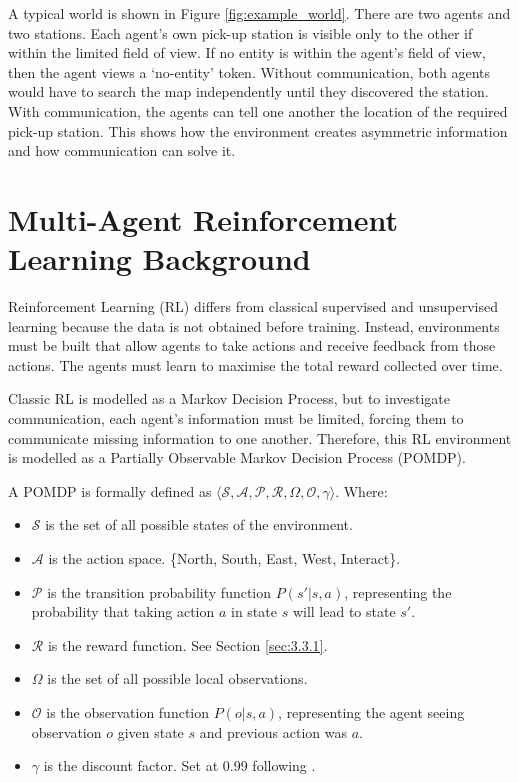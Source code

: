 A typical world is shown in Figure \ref{fig:example_world}. 
There are two agents and two stations.
Each agent's own pick-up station is visible only to the other if within the limited field of view.
If no entity is within the agent's field of view, then the agent views a `no-entity' token.
Without communication, both agents would have to search the map independently until they discovered the station.
With communication, the agents can tell one another the location of the required pick-up station.
This shows how the environment creates asymmetric information and how communication can solve it.

\section{Multi-Agent Reinforcement Learning Background}
\label{sec:2.2}

Reinforcement Learning (RL) differs from classical supervised and unsupervised learning because the data is not obtained before training.
Instead, environments must be built that allow agents to take actions and receive feedback from those actions.
The agents must learn to maximise the total reward collected over time.

Classic RL is modelled as a Markov Decision Process, but to investigate communication, each agent's information must be limited, forcing them to communicate missing information to one another.
Therefore, this RL environment is modelled as a Partially Observable Markov Decision Process (POMDP).

A POMDP is formally defined as $\langle \mathcal{S}, \mathcal{A}, \mathcal{P}, \mathcal{R}, \Omega, \mathcal{O}, \gamma \rangle$.
Where:
\begin{itemize}[noitemsep, topsep=0pt]
    \item $\mathcal{S}$ is the set of all possible states of the environment.
    \item $\mathcal{A}$ is the action space. \{North, South, East, West, Interact\}.
    \item $\mathcal{P}$ is the transition probability function $P(s'|s,a)$, representing the probability that taking action $a$ in state $s$ will lead to state $s'$.
    \item $\mathcal{R}$ is the reward function. See Section \ref{sec:3.3.1}.
    \item $\Omega$ is the set of all possible local observations.
    \item $\mathcal{O}$ is the observation function $P(o|s,a)$, representing the agent seeing observation $o$ given state $s$ and previous action was $a$.
    \item $\gamma$ is the discount factor. Set at 0.99 following \cite{ppo_bestpractices}.
\end{itemize}

